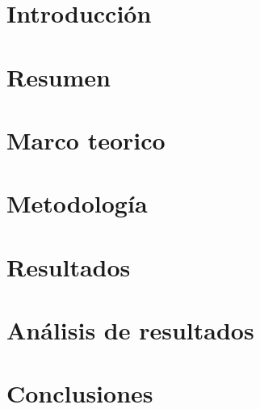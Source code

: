 \documentclass{article}
\begin{document}

\tableofcontents
\newpage

\section{Introducción}

\section{Resumen}

\section{Marco teorico}

\section{Metodología}

\section{Resultados}

\section{Análisis de resultados}

\section{Conclusiones}
\end{document}
